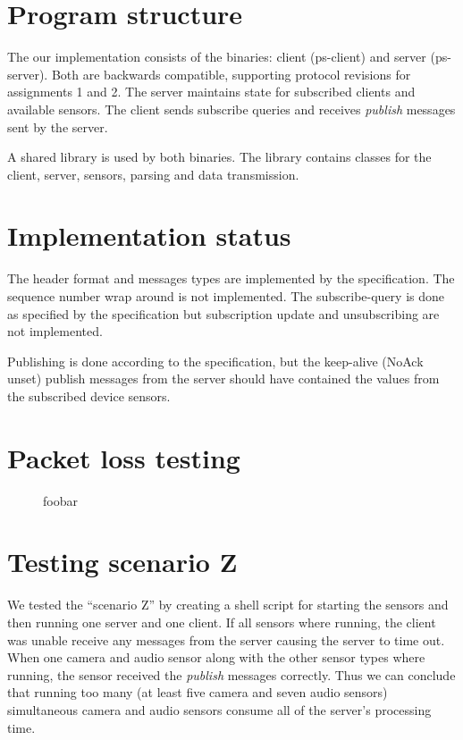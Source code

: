 \documentclass[a4paper]{article}
\begin{document}


\tableofcontents
\newpage

\section{Program structure}
The our implementation consists of the binaries: client (ps-client) and server
(ps-server). Both are backwards compatible, supporting protocol revisions for
assignments 1 and 2. The server maintains state for subscribed clients and
available sensors. The client sends subscribe queries and receives \emph{publish}
messages sent by the server.

A shared library is used by both binaries. The library contains classes for
the client, server, sensors, parsing and data transmission.

\section{Implementation status}
The header format and messages types are implemented by the specification.
The sequence number wrap around is not implemented. The subscribe-query is done
as specified by the specification but subscription update and unsubscribing
are not implemented.

Publishing is done according to the specification, but the keep-alive (NoAck
unset) publish messages from the server should have contained the values from
the subscribed device sensors.


\section{Packet loss testing}
\begin{figure}
\caption{foobar}
\end{figure}
\section{Testing scenario Z}
We tested the ``scenario Z'' by creating a shell script
for starting the sensors and then running one server and one client. If all
sensors where running, the client was unable receive any messages from the
server causing the server to time out. When one camera and audio sensor along
with the other sensor types where running, the sensor received the \emph{publish}
messages correctly. Thus we can conclude that running too many (at least five
camera and seven audio sensors) simultaneous camera and audio sensors consume
all of the server's processing time.
\end{document}
